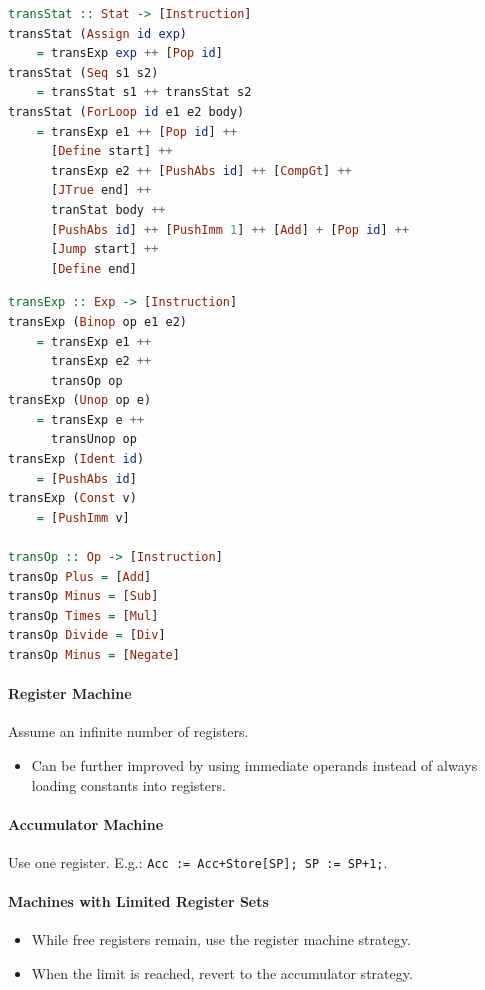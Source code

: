 \documentclass[twocolumn,english]{article}
\let\emph\relax
\begin{document}
\begin{lstlisting}[language=Haskell,tabsize=2]
transStat :: Stat -> [Instruction]
transStat (Assign id exp)
	= transExp exp ++ [Pop id]
transStat (Seq s1 s2)
	= transStat s1 ++ transStat s2
transStat (ForLoop id e1 e2 body)
	= transExp e1 ++ [Pop id] ++
	  [Define start] ++
	  transExp e2 ++ [PushAbs id] ++ [CompGt] ++
	  [JTrue end] ++
	  tranStat body ++
	  [PushAbs id] ++ [PushImm 1] ++ [Add] + [Pop id] ++
	  [Jump start] ++
	  [Define end]
\end{lstlisting}


\begin{lstlisting}[language=Haskell,tabsize=2]
transExp :: Exp -> [Instruction]
transExp (Binop op e1 e2)
	= transExp e1 ++
	  transExp e2 ++
	  transOp op
transExp (Unop op e)
	= transExp e ++
	  transUnop op
transExp (Ident id)
	= [PushAbs id]
transExp (Const v)
	= [PushImm v]

transOp :: Op -> [Instruction]
transOp Plus = [Add]
transOp Minus = [Sub]
transOp Times = [Mul]
transOp Divide = [Div]
transOp Minus = [Negate]
\end{lstlisting}



\paragraph{Register Machine}

Assume an infinite number of registers. 
\begin{itemize}
\item Can be further improved by using immediate operands instead of always
loading constants into registers. 
\end{itemize}

\paragraph{Accumulator Machine}

Use one register. E.g.\texttt{\emph{ Add}}: \texttt{Acc := Acc+Store{[}SP{]};
SP := SP+1;}. 


\paragraph{Machines with Limited Register Sets}
\begin{itemize}
\item While free registers remain, use the register machine strategy. 
\item When the limit is reached, revert to the accumulator strategy. 
\end{itemize}
\end{document}
